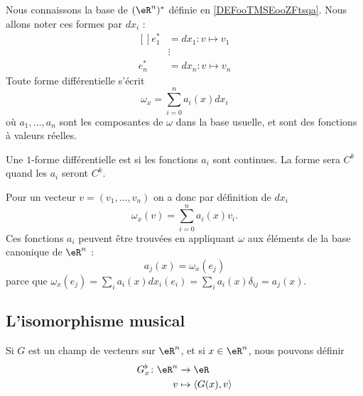 Nous connaissons la base de \( (\eR^n)^*\) définie en \ref{DEFooTMSEooZFtsqa}. Nous allons noter ces formes par \( dx_i\) :
\begin{equation}        \label{EQooITHKooDzigPY}
	\begin{aligned}[]
		e^*_1 & =dx_1\colon v\mapsto v_1 \\
		      & \vdots                   \\
		e^*_n & =dx_n\colon v\mapsto v_n
	\end{aligned}
\end{equation}
Toute forme différentielle s'écrit
\begin{equation}
	\omega_x = \sum_{i=0}^n a_i(x) d x_i
\end{equation}
où \( a_1,\ldots,a_n\) sont les composantes de \( \omega\) dans la base usuelle, et sont des fonctions à valeurs réelles.

\begin{lemma}
	Une \( 1\)-forme différentielle est  si les fonctions \( a_i\) sont continues. La forme sera \( C^k\) quand les \( a_i\) seront \( C^k\).
\end{lemma}

Pour un vecteur \( v = (v_1,\ldots,v_n)\) on a donc par définition de \( d x_i\)
\begin{equation}
	\omega_x (v) = \sum_{i=0}^n a_i(x) v_i.
\end{equation}
Ces fonctions \( a_i\) peuvent être trouvées en appliquant \( \omega\) aux éléments de la base canonique de \( \eR^n\) :
\begin{equation}
	a_j(x)=\omega_x(e_j)
\end{equation}
parce que \( \omega_x(e_j)=\sum_ia_i(x)dx_i(e_i)=\sum_ia_i(x)\delta_{ij}=a_j(x)\).

\subsection{L'isomorphisme musical}

Si \( G\) est un champ de vecteurs sur \( \eR^n\), et si \( x\in\eR^n\), nous pouvons définir
\begin{equation}		\label{EqDefBemol}
	\begin{aligned}[]
		G^{\flat}_x\colon \eR^n & \to \eR                        \\
		v                       & \mapsto \langle G(x), v\rangle
	\end{aligned}
\end{equation}

